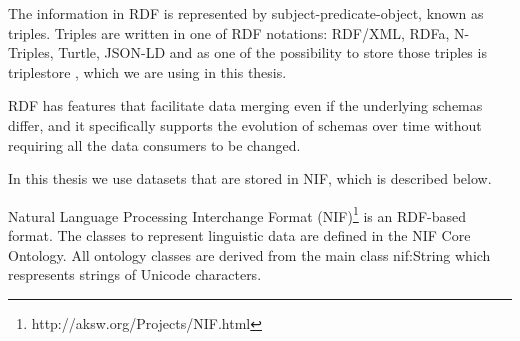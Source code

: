 \documentclass[thesis=M,english]{FITthesis}[2018/05/30]
\begin{document}
	The information in RDF is represented by subject-predicate-object, known as triples. Triples are written in one of RDF notations: RDF/XML, RDFa, N-Triples, Turtle, JSON-LD and as one of the possibility to store those triples is triplestore \cite{master:SPARQL}, which we are using in this thesis.
	
	RDF \cite{w3c:RDF} has features that facilitate data merging even if the underlying schemas differ, and it specifically supports the evolution of schemas over time without requiring all the data consumers to be changed.
	
	In this thesis we use datasets that are stored in NIF, which is described below. 

	Natural Language Processing Interchange Format (NIF)\footnote{http://aksw.org/Projects/NIF.html} \cite{w3c:NIF} is an RDF-based format. The classes to represent linguistic data are defined in the NIF Core Ontology. All ontology classes are derived from the main class nif:String which respresents strings of Unicode characters.
	
	
	
\end{document}
